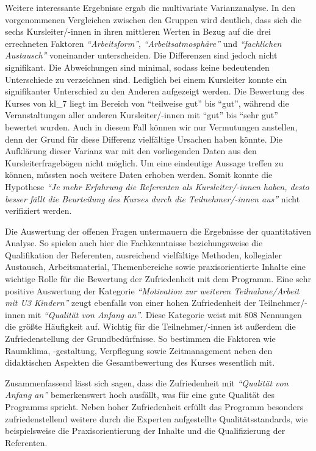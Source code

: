 \documentclass[12pt,a4paper]{article}
\begin{document}
Weitere interessante Ergebnisse ergab die multivariate Varianzanalyse. In den vorgenommenen Vergleichen zwischen den Gruppen wird deutlich, dass sich die sechs Kursleiter/-innen in ihren mittleren Werten in Bezug auf die drei errechneten Faktoren \textit{"`Arbeitsform"'}, \textit{"`Arbeitsatmosphäre"'} und \textit{"`fachlichen Austausch"'} voneinander unterscheiden. Die Differenzen sind jedoch nicht signifikant. Die Abweichungen sind minimal, sodass keine bedeutenden Unterschiede zu verzeichnen sind. Lediglich bei einem Kursleiter konnte ein signifikanter Unterschied zu den Anderen aufgezeigt werden. Die Bewertung des Kurses von kl\_7 liegt im Bereich von "`teilweise gut"' bis "`gut"', während die Veranstaltungen aller anderen Kursleiter/-innen  mit "`gut"' bis "`sehr gut"' bewertet wurden. Auch in diesem Fall können wir nur Vermutungen anstellen, denn der Grund für diese Differenz vielfältige Ursachen haben könnte. Die Aufklärung dieser Varianz war mit den vorliegenden Daten aus den Kursleiterfragebögen nicht möglich. Um eine eindeutige Aussage treffen zu können, müssten noch weitere Daten erhoben werden. Somit konnte die Hypothese \textit{"`Je mehr Erfahrung die Referenten als Kursleiter/-innen haben, desto besser fällt die Beurteilung des Kurses durch die Teilnehmer/-innen aus"'} nicht verifiziert werden.

Die Auswertung der offenen Fragen untermauern die Ergebnisse der quantitativen Analyse. So spielen auch hier die Fachkenntnisse beziehungsweise die Qualifikation der Referenten, ausreichend vielfältige Methoden, kollegialer Austausch, Arbeitsmaterial, Themenbereiche sowie praxisorientierte Inhalte eine wichtige Rolle für die Bewertung der Zufriedenheit mit dem Programm. Eine sehr positive Auswertung der Kategorie\textit{ "`Motivation zur weiteren Teilnahme/Arbeit mit U3 Kindern"'} zeugt ebenfalls von einer hohen Zufriedenheit der Teilnehmer/-innen mit\textit{ "`Qualität von Anfang an"'}. Diese Kategorie weist mit 808 Nennungen die größte Häufigkeit auf. Wichtig für die Teilnehmer/-innen ist außerdem die Zufriedenstellung der Grundbedürfnisse. So bestimmen die Faktoren wie Raumklima, -gestaltung, Verpflegung sowie Zeitmanagement neben den didaktischen Aspekten die Gesamtbewertung des Kurses wesentlich mit. 

Zusammenfassend lässt sich sagen, dass die Zufriedenheit mit\textit{ "`Qualität von Anfang an"'}  bemerkenswert hoch ausfällt, was für eine gute Qualität des Programms spricht. Neben hoher Zufriedenheit erfüllt das Programm besonders zufriedenstellend weitere durch die Experten aufgestellte Qualitätsstandards, wie beispielsweise die Praxisorientierung der Inhalte und die Qualifizierung der Referenten. 
\end{document}
